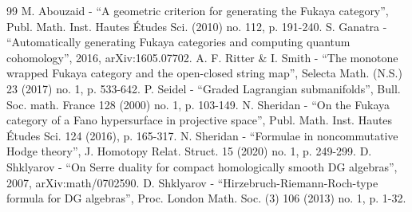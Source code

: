 \documentclass[10pt]{amsart}
\theoremstyle{definition}
\begin{document}
\begin{thebibliography}{99}
 M. Abouzaid - “A geometric criterion for generating the Fukaya category”, Publ. Math. Inst. Hautes Études Sci. (2010) no. 112, p. 191-240.
 S. Ganatra - “Automatically generating Fukaya categories and computing quantum cohomology”, 2016, arXiv:1605.07702.
 A. F. Ritter \& I. Smith - “The monotone wrapped Fukaya category and the open-closed string map”, Selecta Math. (N.S.) 23 (2017) no. 1, p. 533-642.
 P. Seidel - “Graded Lagrangian submanifolds”, Bull. Soc. math. France 128 (2000) no. 1, p. 103-149.
 N. Sheridan - “On the Fukaya category of a Fano hypersurface in projective space”, Publ. Math. Inst. Hautes Études Sci. 124 (2016), p. 165-317.
 N. Sheridan - “Formulae in noncommutative Hodge theory”, J. Homotopy Relat. Struct. 15 (2020) no. 1, p. 249-299.
 D. Shklyarov - “On Serre duality for compact homologically smooth DG algebras”, 2007, arXiv:math/0702590.
 D. Shklyarov - “Hirzebruch-Riemann-Roch-type formula for DG algebras”, Proc. London Math. Soc. (3) 106 (2013) no. 1, p. 1-32.
\end{thebibliography}
\end{document}
